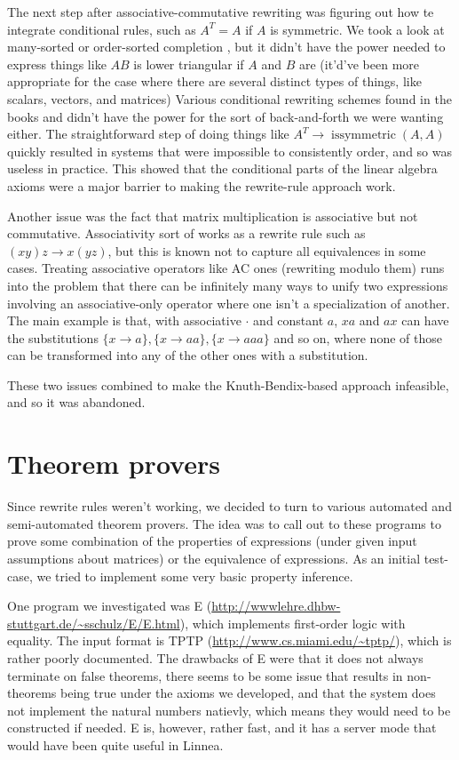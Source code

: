 \documentclass[12pt,letterpaper]{article}
\begin{document}
The next step after associative-commutative rewriting was figuring out how te integrate conditional rules, such as $A^T = A$ if $A$ is symmetric.
We took a look at many-sorted or order-sorted completion \cite{Ganzinger1991,Goguen1985}, but it didn't have the power needed to express things like $AB$ is lower triangular if $A$ and $B$ are (it'd've been more appropriate for the case where there are several distinct types of things, like scalars, vectors, and matrices)
Various conditional rewriting schemes found in the books and \cite{Marchiori1997} didn't have the power for the sort of back-and-forth we were wanting either.
The straightforward step of doing things like $A^T \to \operatorname{issymmetric}(A, A)$ quickly resulted in systems that were impossible to consistently order, and so was useless in practice.
This showed that the conditional parts of the linear algebra axioms were a major barrier to making the rewrite-rule approach work.

Another issue was the fact that matrix multiplication is associative but not commutative.
Associativity sort of works as a rewrite rule such as $(xy)z \to x(yz)$, but this is known not to capture all equivalences in some cases.
Treating associative operators like AC ones (rewriting modulo them) runs into the problem that there can be infinitely many ways to unify two expressions involving an associative-only operator where one isn't a specialization of another.
The main example is that, with associative $\cdot$ and constant $a$, $xa$ and $ax$ can have the substitutions $\{x \to a\}, \{x \to aa\}, \{x \to aaa\}$ and so on, where none of those can be transformed into any of the other ones with a substitution.

These two issues combined to make the Knuth-Bendix-based approach infeasible, and so it was abandoned.

\section{Theorem provers}
Since rewrite rules weren't working, we decided to turn to various automated and semi-automated theorem provers.
The idea was to call out to these programs to prove some combination of the properties of expressions (under given input assumptions about matrices) or the equivalence of expressions.
As an initial test-case, we tried to implement some very basic property inference.

One program we investigated was E (\url{http://wwwlehre.dhbw-stuttgart.de/~sschulz/E/E.html}), which implements first-order logic with equality.
The input format is TPTP (\url{http://www.cs.miami.edu/~tptp/}), which is rather poorly documented.
The drawbacks of E were that it does not always terminate on false theorems, there seems to be some issue that results in non-theorems being true under the axioms we developed, and that the system does not implement the natural numbers natievly, which means they would need to be constructed if needed.
E is, however, rather fast, and it has a server mode that would have been quite useful in Linnea.
\end{document}
